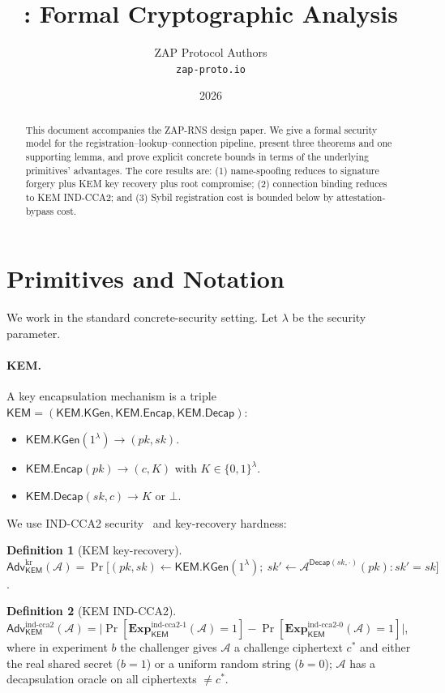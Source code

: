 \documentclass[11pt,a4paper]{article}
\title{\RNS: Formal Cryptographic Analysis}
\author{ZAP Protocol Authors\\\texttt{zap-proto.io}}
\date{2026}
\theoremstyle{definition}
\newtheorem{definition}{Definition}
\theoremstyle{remark}
\newcommand{\KEM}{\mathsf{KEM}}
\newcommand{\Adv}{\mathsf{Adv}}
\newcommand{\KGen}{\mathsf{KGen}}
\newcommand{\Encap}{\mathsf{Encap}}
\newcommand{\Decap}{\mathsf{Decap}}
\newcommand{\pk}{\mathit{pk}}
\newcommand{\sk}{\mathit{sk}}
\newcommand{\RNS}{\textsc{ZAP-RNS}}
\newcommand{\bit}{\{0,1\}}
\begin{document}
\maketitle

\begin{abstract}
This document accompanies the \RNS{} design paper. We give a formal
security model for the registration--lookup--connection pipeline,
present three theorems and one supporting lemma, and prove explicit
concrete bounds in terms of the underlying primitives' advantages. The
core results are: (1) name-spoofing reduces to signature forgery plus
KEM key recovery plus root compromise; (2) connection binding reduces
to KEM IND-CCA2; and (3) Sybil registration cost is bounded below by
attestation-bypass cost.
\end{abstract}

\section{Primitives and Notation}

We work in the standard concrete-security setting. Let $\lambda$ be the
security parameter.

\paragraph{KEM.} A key encapsulation mechanism is a triple
$\KEM = (\KEM.\KGen, \KEM.\Encap, \KEM.\Decap)$:
\begin{itemize}[leftmargin=*]
\item $\KEM.\KGen(1^\lambda) \to (\pk, \sk)$.
\item $\KEM.\Encap(\pk) \to (c, K)$ with $K \in \bit^\lambda$.
\item $\KEM.\Decap(\sk, c) \to K$ or $\bot$.
\end{itemize}
We use IND-CCA2 security~\cite{shoup2001} and key-recovery hardness:

\begin{definition}[KEM key-recovery]
$\Adv^{\mathrm{kr}}_{\KEM}(\mathcal{A}) = \Pr\bigl[(\pk, \sk) \gets
\KEM.\KGen(1^\lambda);\ \sk' \gets \mathcal{A}^{\Decap(\sk, \cdot)}(\pk):
\sk' = \sk \bigr]$.
\end{definition}

\begin{definition}[KEM IND-CCA2]
$\Adv^{\mathrm{ind\text{-}cca2}}_{\KEM}(\mathcal{A}) =
\bigl|\Pr[\mathbf{Exp}^{\mathrm{ind\text{-}cca2}\text{-}1}_{\KEM}(\mathcal{A}) = 1]
- \Pr[\mathbf{Exp}^{\mathrm{ind\text{-}cca2}\text{-}0}_{\KEM}(\mathcal{A}) = 1]\bigr|$,
where in experiment $b$ the challenger gives $\mathcal{A}$ a challenge
ciphertext $c^*$ and either the real shared secret ($b=1$) or a
uniform random string ($b=0$); $\mathcal{A}$ has a decapsulation oracle
on all ciphertexts $\ne c^*$.
\end{definition}
\end{document}
